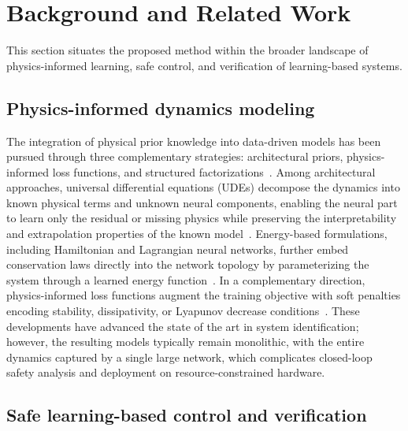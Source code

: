 \documentclass[12pt,a4paper]{article}
\begin{document}
\section{Background and Related Work}
\label{sec:background}

This section situates the proposed method within the broader landscape
of physics-informed learning, safe control, and verification of
learning-based systems.

\subsection{Physics-informed dynamics modeling}
\label{subsec:bg-id}

The integration of physical prior knowledge into data-driven models has
been pursued through three complementary strategies: architectural
priors, physics-informed loss functions, and structured
factorizations~\cite{nghiem2023piml,legaard2023physss}. Among
architectural approaches, universal differential equations (UDEs)
decompose the dynamics into known physical terms and unknown neural
components, enabling the neural part to learn only the residual or
missing physics while preserving the interpretability and extrapolation
properties of the known model~\cite{rackauckas2021ude}. Energy-based
formulations, including Hamiltonian and Lagrangian neural networks,
further embed conservation laws directly into the network topology by
parameterizing the system through a learned energy
function~\cite{greydanus2019hnn,zhong2020symplectic,lutter2023lagrangian}.
In a complementary direction, physics-informed loss functions augment
the training objective with soft penalties encoding stability,
dissipativity, or Lyapunov decrease
conditions~\cite{nghiem2023piml,chang2019neural,dawson2023survey}.
These developments have advanced the state of the art in system
identification; however, the resulting models typically remain
monolithic, with the entire dynamics captured by a single large
network, which complicates closed-loop safety analysis and deployment on
resource-constrained hardware.

\subsection{Safe learning-based control and verification}
\label{subsec:bg-control}
\end{document}
